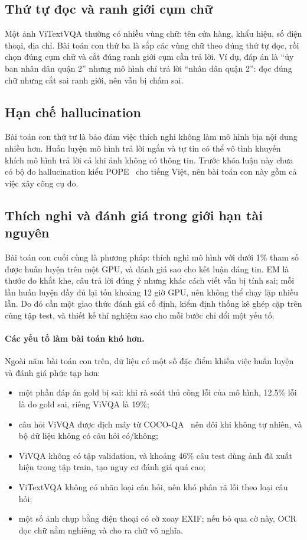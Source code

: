 \subsection{Thứ tự đọc và ranh giới cụm chữ}

Một ảnh ViTextVQA thường có nhiều vùng chữ: tên cửa hàng, khẩu hiệu, số điện
thoại, địa chỉ. Bài toán con thứ ba là sắp các vùng chữ theo đúng thứ tự đọc, rồi
chọn đúng cụm chữ và cắt đúng ranh giới cụm cần trả lời. Ví dụ, đáp án là ``ủy
ban nhân dân quận 2'' nhưng mô hình chỉ trả lời ``nhân dân quận 2'': đọc đúng chữ
nhưng cắt sai ranh giới, nên vẫn bị chấm sai.

\subsection{Hạn chế hallucination}

Bài toán con thứ tư là bảo đảm việc thích nghi không làm mô hình bịa nội dung
nhiều hơn. Huấn luyện mô hình trả lời ngắn và tự tin có thể vô tình khuyến khích
mô hình trả lời cả khi ảnh không có thông tin. Trước khóa luận này chưa có bộ đo
hallucination kiểu POPE~\cite{li2023pope} cho tiếng Việt, nên bài toán con này
gồm cả việc xây công cụ đo.

\subsection{Thích nghi và đánh giá trong giới hạn tài nguyên}

Bài toán con cuối cùng là phương pháp: thích nghi mô hình với dưới 1\% tham số
được huấn luyện trên một GPU, và đánh giá sao cho kết luận đáng tin. EM là thước
đo khắt khe, câu trả lời đúng ý nhưng khác cách viết vẫn bị tính sai; mỗi lần
huấn luyện đầy đủ lại tốn khoảng 12 giờ GPU, nên không thể chạy lặp nhiều lần. Do
đó cần một giao thức đánh giá cố định, kiểm định thống kê ghép cặp trên cùng tập
test, và thiết kế thí nghiệm sao cho mỗi bước chỉ đổi một yếu tố.

\paragraph{Các yếu tố làm bài toán khó hơn.} Ngoài năm bài toán con trên, dữ liệu
có một số đặc điểm khiến việc huấn luyện và đánh giá phức tạp hơn:

\begin{itemize}
  \item một phần đáp án gold bị sai: khi rà soát thủ công lỗi của mô hình, 12,5\% lỗi là
  do gold sai, riêng ViVQA là 19\%;
  \item câu hỏi ViVQA được dịch máy từ COCO-QA~\cite{ren2015cocoqa} nên đôi khi
  không tự nhiên, và bộ dữ liệu không có câu hỏi có/không;
  \item ViVQA không có tập validation, và khoảng 46\% câu test dùng ảnh đã xuất
  hiện trong tập train, tạo nguy cơ đánh giá quá cao;
  \item ViTextVQA không có nhãn loại câu hỏi, nên khó phân rã lỗi theo loại câu
  hỏi;
  \item một số ảnh chụp bằng điện thoại có cờ xoay EXIF; nếu bỏ qua cờ này, OCR
  đọc chữ nằm nghiêng và cho ra chữ vô nghĩa.
\end{itemize}

